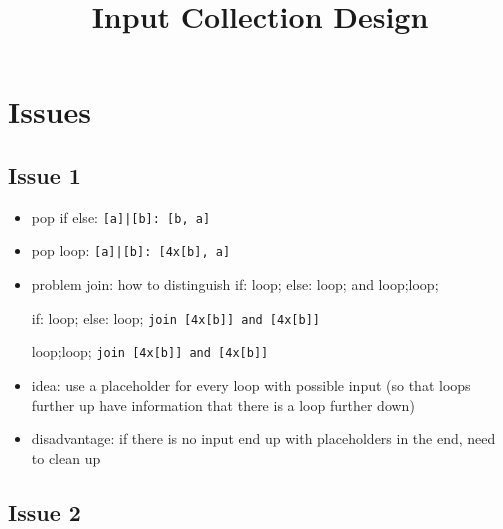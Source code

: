 \documentclass[11pt]{article}
\begin{document}
\title{Input Collection Design}

\maketitle


\section{Issues}

\subsection{Issue 1}

\begin{itemize}
\item pop if else: \verb/[a]|[b]: [b, a]/
\item pop loop: \verb/[a]|[b]: [4x[b], a]/
\item problem join: how to distinguish if: loop; else: loop; and loop;loop;

if: loop; else: loop; \verb/join [4x[b]] and [4x[b]]/

loop;loop; \verb/join [4x[b]] and [4x[b]]/

\item idea: use a placeholder for every loop with possible input (so that loops further up have information that there is a loop further down)
\item disadvantage: if there is no input end up with placeholders in the end, need to clean up
\end{itemize}

\subsection{Issue 2}
\end{document}
